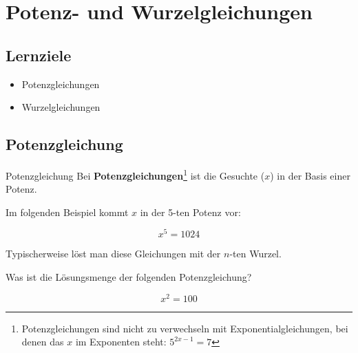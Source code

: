 
\section{Potenz- und Wurzelgleichungen}


\subsection*{Lernziele}

\begin{itemize}
\item Potenzgleichungen
\item Wurzelgleichungen
\end{itemize}
\newpage


\newpage


\subsection{Potenzgleichung}
\begin{definition}{Potenzgleichung}{}
  Bei \textbf{Potenzgleichungen}\footnote{Potenzgleichungen sind nicht zu
  verwechseln mit Exponentialgleichungen, bei denen das $x$ im
  Exponenten steht: $5^{2x-1}=7$} ist die Gesuchte ($x$) in der Basis
  einer Potenz.
\end{definition}

Im folgenden Beispiel kommt $x$ in der 5-ten Potenz vor:

$$x^5 = 1024$$

Typischerweise löst man diese Gleichungen mit der $n$-ten Wurzel.


Was ist die Lösungsmenge der folgenden Potenzgleichung?

$$x^2 = 100$$


